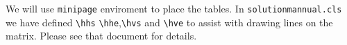 %
%
%

We will use \texttt{minipage} enviroment to place the tables.
In \texttt{solutionmannual.cls} we have defined \texttt{\textbackslash hhs}
\texttt{\textbackslash hhe},\texttt{\textbackslash hvs} and \texttt{\textbackslash hve}
to assist with drawing lines on the matrix. Please see that document for details.

